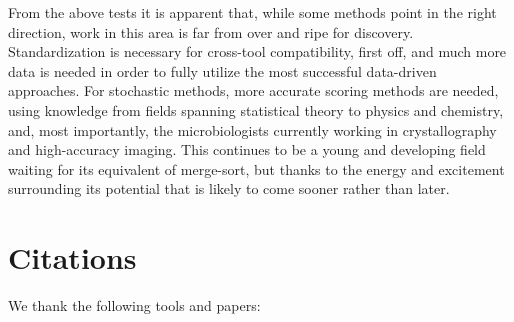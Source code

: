 \documentclass{article}
\begin{document}
From the above tests it is apparent that, while some methods point in the right direction, work in this area is far from over and ripe for discovery. Standardization is necessary for cross-tool compatibility, first off, and much more data is needed in order to fully utilize the most successful data-driven approaches. For stochastic methods, more accurate scoring methods are needed, using knowledge from fields spanning statistical theory to physics and chemistry, and, most importantly, the microbiologists currently working in crystallography and high-accuracy imaging. This continues to be a young and developing field waiting for its equivalent of merge-sort, but thanks to the energy and excitement surrounding its potential that is likely to come sooner rather than later.

\section{Citations}

We thank the following tools and papers: \\
\end{document}
